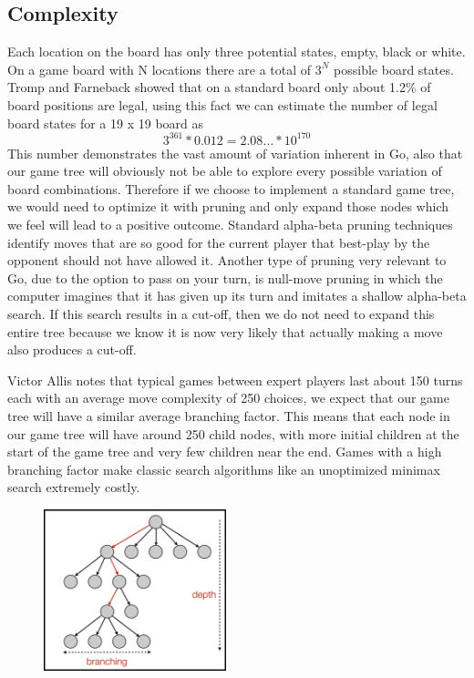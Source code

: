 \documentclass[conference]{IEEEtran}
\begin{document}
\subsection{Complexity}
Each location on the board has only three potential states, empty, black or white. On a game board with N locations there are a total of $3^N$ possible board states. Tromp and Farneback showed that on a standard board only about 1.2\% of board positions are legal, using this fact we can estimate the number of legal board states for a 19 x 19 board as \[3^{361} * 0.012 = 2.08\dots * 10^{170}\]This number demonstrates the vast amount of variation inherent in Go, also that our game tree will obviously not be able to explore every possible variation of board combinations. Therefore if we choose to implement a standard game tree, we would need to optimize it with pruning and only expand those nodes which we feel will lead to a positive outcome. Standard alpha-beta pruning techniques identify moves that are so good for the current player that best-play by the opponent should not have allowed it. Another type of pruning very relevant to Go, due to the option to pass on your turn, is null-move pruning in which the computer imagines that it has given up its turn and imitates a shallow alpha-beta search. If this search results in a cut-off, then we do not need to expand this entire tree because we know it is now very likely that actually making a move also produces a cut-off.\par
Victor Allis notes that typical games between expert players last about 150 turns each with an average move complexity of 250 choices, we expect that our game tree will have a similar average branching factor. This means that each node in our game tree will have around 250 child nodes, with more initial children at the start of the game tree and very few children near the end. Games with a high branching factor make classic search algorithms like an unoptimized minimax search extremely costly.

\begin{figure}[h]
\includegraphics[width=200px]{branching}
\centering
\end{figure}
\end{document}
